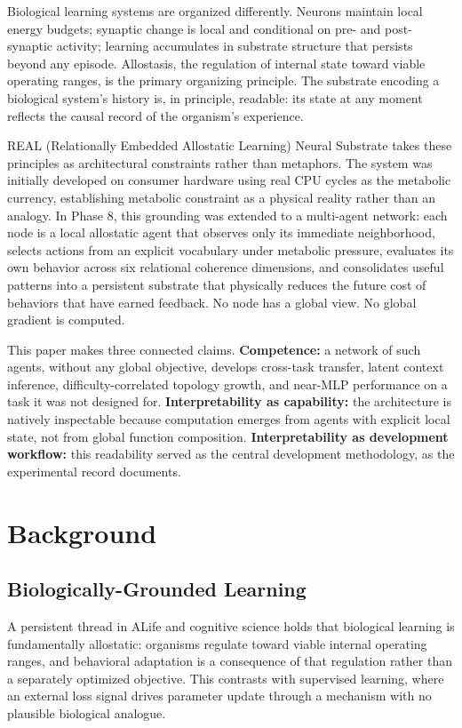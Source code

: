 \documentclass[letterpaper]{article}
\begin{document}
Biological learning systems are organized differently. Neurons maintain local
energy budgets; synaptic change is local and conditional on pre- and post-synaptic
activity; learning accumulates in substrate structure that persists beyond any
episode. Allostasis, the regulation of internal state toward viable operating
ranges, is the primary organizing principle. The substrate encoding a biological
system's history is, in principle, readable: its state at any moment reflects the
causal record of the organism's experience.

REAL (Relationally Embedded Allostatic Learning) Neural Substrate takes these
principles as architectural constraints rather than metaphors. The system was
initially developed on consumer hardware using real CPU cycles as the metabolic
currency, establishing metabolic constraint as a physical reality rather than an
analogy. In Phase 8, this grounding was extended to a multi-agent network: each
node is a local allostatic agent that observes only its immediate neighborhood,
selects actions from an explicit vocabulary under metabolic pressure, evaluates
its own behavior across six relational coherence dimensions, and consolidates
useful patterns into a persistent substrate that physically reduces the future
cost of behaviors that have earned feedback. No node has a global view. No global
gradient is computed.

This paper makes three connected claims. \textbf{Competence:} a network of such
agents, without any global objective, develops cross-task transfer, latent context
inference, difficulty-correlated topology growth, and near-MLP performance on a
task it was not designed for. \textbf{Interpretability as capability:} the
architecture is natively inspectable because computation emerges from agents with
explicit local state, not from global function composition.
\textbf{Interpretability as development workflow:} this readability served as the
central development methodology, as the experimental record documents.

\section{Background}

\subsection{Biologically-Grounded Learning}

A persistent thread in ALife and cognitive science holds that biological learning
is fundamentally allostatic: organisms regulate toward viable internal operating
ranges, and behavioral adaptation is a consequence of that regulation rather than
a separately optimized objective. This contrasts with supervised learning, where
an external loss signal drives parameter update through a mechanism with no
plausible biological analogue.
\end{document}
